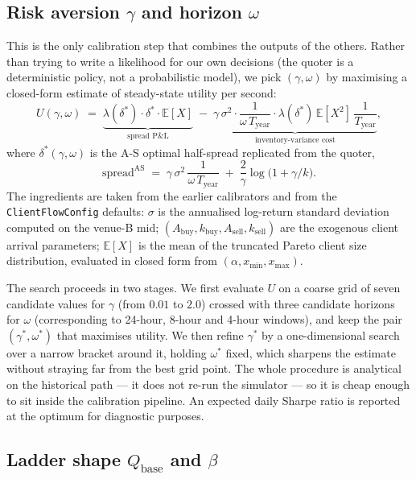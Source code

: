 \subsection{Risk aversion $\gamma$ and horizon $\omega$}

This is the only calibration step that combines the outputs of the
others. Rather than trying to write a likelihood for our own
decisions (the quoter is a deterministic policy, not a probabilistic
model), we pick $(\gamma, \omega)$ by maximising a closed-form
estimate of steady-state utility per second:
\[
U(\gamma, \omega) \;=\;
\underbrace{\lambda(\delta^\ast) \cdot \delta^\ast \cdot \mathbb{E}[X]}_{\text{spread P\&L}}
\;-\;
\underbrace{\gamma\,\sigma^2
\cdot \frac{1}{\omega\,T_{\text{year}}}
\cdot \lambda(\delta^\ast)\,\mathbb{E}[X^2]\,\frac{1}{T_{\text{year}}}}_{\text{inventory-variance cost}},
\]
where $\delta^\ast(\gamma,\omega)$ is the A-S optimal half-spread
replicated from the quoter,
\[
\text{spread}^{\text{AS}}
\;=\; \gamma\,\sigma^2\,\frac{1}{\omega\,T_{\text{year}}}
\;+\; \frac{2}{\gamma}\log\!\bigl(1 + \gamma / k\bigr).
\]
The ingredients are taken from the earlier calibrators and from the
\texttt{ClientFlowConfig} defaults: $\sigma$ is the annualised log-return
standard deviation computed on the venue-B mid; $(A_{\text{buy}}, k_{\text{buy}},
A_{\text{sell}}, k_{\text{sell}})$ are the exogenous client arrival
parameters; $\mathbb{E}[X]$ is the mean of the truncated Pareto client
size distribution, evaluated in closed form from
$(\alpha, x_{\min}, x_{\max})$.

The search proceeds in two stages. We first evaluate $U$ on a
coarse grid of seven candidate values for $\gamma$ (from $0.01$ to
$2.0$) crossed with three candidate horizons for $\omega$
(corresponding to 24-hour, 8-hour and 4-hour windows), and keep the
pair $(\gamma^\ast, \omega^\ast)$ that maximises utility. We then
refine $\gamma^\ast$ by a one-dimensional search over a narrow
bracket around it, holding $\omega^\ast$ fixed, which sharpens the
estimate without straying far from the best grid point. The whole
procedure is analytical on the historical path --- it does not
re-run the simulator --- so it is cheap enough to sit inside the
calibration pipeline. An expected daily Sharpe ratio is reported at
the optimum for diagnostic purposes.

\subsection{Ladder shape $Q_{\text{base}}$ and $\beta$}

